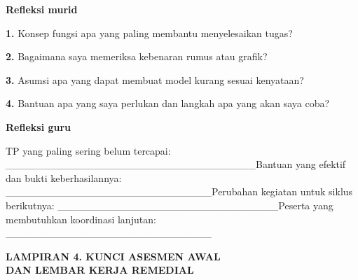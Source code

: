 \documentclass[11pt,a4paper]{article}
\begin{document}
\par\medskip\noindent\textbf{Refleksi murid}\par\smallskip
\noindent\textbf{1.} Konsep fungsi apa yang paling membantu menyelesaikan tugas?\par\vspace{6mm}
\noindent\textbf{2.} Bagaimana saya memeriksa kebenaran rumus atau grafik?\par\vspace{6mm}
\noindent\textbf{3.} Asumsi apa yang dapat membuat model kurang sesuai kenyataan?\par\vspace{6mm}
\noindent\textbf{4.} Bantuan apa yang saya perlukan dan langkah apa yang akan saya coba?\par\vspace{6mm}
\par\medskip\noindent\textbf{Refleksi guru}\par\smallskip
{\small TP yang paling sering belum tercapai: \_\_\_\_\_\_\_\_\_\_\_\_\_\_\_\_\_\_\_\_\_\_\_\_\_\_\_\_\_\_\_\_\_\_\newline Bantuan yang efektif dan bukti keberhasilannya: \_\_\_\_\_\_\_\_\_\_\_\_\_\_\_\_\_\_\_\_\_\_\_\_\_\_\_\_\newline Perubahan kegiatan untuk siklus berikutnya: \_\_\_\_\_\_\_\_\_\_\_\_\_\_\_\_\_\_\_\_\_\_\_\_\_\_\_\_\_\_\newline Peserta yang membutuhkan koordinasi lanjutan: \_\_\_\_\_\_\_\_\_\_\_\_\_\_\_\_\_\_\_\_\_\_\_\_\_\_\_\_\par}\medskip
\clearpage
\begin{center}\bfseries\large LAMPIRAN 4. KUNCI ASESMEN AWAL\\[2pt] DAN LEMBAR KERJA REMEDIAL\end{center}\medskip
\end{document}
